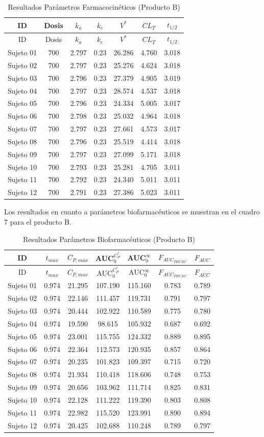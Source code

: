 \documentclass[]{article}
\begin{document}
\begin{longtable}[]{@{}ccccccc@{}}
\caption{Resultados Parámetros Farmacocinéticos (Producto
B)}\tabularnewline
\toprule
ID & Dosis & \(k_{a}\) & \(k_{e}\) & \(V^{*}\) & \(CL_{T}\) &
\(t_{1/2}\)\tabularnewline
\midrule
\endfirsthead
\toprule
ID & Dosis & \(k_{a}\) & \(k_{e}\) & \(V^{*}\) & \(CL_{T}\) &
\(t_{1/2}\)\tabularnewline
\midrule
\endhead
Sujeto 01 & 700 & 2.797 & 0.23 & 26.286 & 4.760 & 3.018\tabularnewline
Sujeto 02 & 700 & 2.797 & 0.23 & 25.276 & 4.624 & 3.018\tabularnewline
Sujeto 03 & 700 & 2.796 & 0.23 & 27.379 & 4.905 & 3.019\tabularnewline
Sujeto 04 & 700 & 2.797 & 0.23 & 28.574 & 4.537 & 3.018\tabularnewline
Sujeto 05 & 700 & 2.796 & 0.23 & 24.334 & 5.005 & 3.017\tabularnewline
Sujeto 06 & 700 & 2.798 & 0.23 & 25.032 & 4.964 & 3.018\tabularnewline
Sujeto 07 & 700 & 2.797 & 0.23 & 27.661 & 4.573 & 3.017\tabularnewline
Sujeto 08 & 700 & 2.796 & 0.23 & 25.519 & 4.414 & 3.018\tabularnewline
Sujeto 09 & 700 & 2.797 & 0.23 & 27.099 & 5.171 & 3.018\tabularnewline
Sujeto 10 & 700 & 2.793 & 0.23 & 25.281 & 4.705 & 3.011\tabularnewline
Sujeto 11 & 700 & 2.792 & 0.23 & 24.340 & 5.011 & 3.011\tabularnewline
Sujeto 12 & 700 & 2.791 & 0.23 & 27.386 & 5.023 & 3.011\tabularnewline
\bottomrule
\end{longtable}

Los resultados en cuanto a parámetros biofarmacéuticos se muestran en el
cuadro 7 para el producto B.

\begin{longtable}[]{@{}ccccccc@{}}
\caption{Resultados Parámetros Biofarmacéuticos (Producto
B)}\tabularnewline
\toprule
ID & \(t_{max}\) & \(C_{P,max}\) & AUC\(_{0}^{C_{P}^{*}}\) &
AUC\(_{0}^{\infty}\) & \(F_{AUC_{TRUNC}}\) & \(F_{AUC}\)\tabularnewline
\midrule
\endfirsthead
\toprule
ID & \(t_{max}\) & \(C_{P,max}\) & AUC\(_{0}^{C_{P}^{*}}\) &
AUC\(_{0}^{\infty}\) & \(F_{AUC_{TRUNC}}\) & \(F_{AUC}\)\tabularnewline
\midrule
\endhead
Sujeto 01 & 0.974 & 21.295 & 107.190 & 115.160 & 0.783 &
0.789\tabularnewline
Sujeto 02 & 0.974 & 22.146 & 111.457 & 119.731 & 0.791 &
0.797\tabularnewline
Sujeto 03 & 0.974 & 20.444 & 102.922 & 110.589 & 0.775 &
0.780\tabularnewline
Sujeto 04 & 0.974 & 19.590 & 98.615 & 105.932 & 0.687 &
0.692\tabularnewline
Sujeto 05 & 0.974 & 23.001 & 115.755 & 124.332 & 0.889 &
0.895\tabularnewline
Sujeto 06 & 0.974 & 22.364 & 112.573 & 120.935 & 0.857 &
0.864\tabularnewline
Sujeto 07 & 0.974 & 20.235 & 101.823 & 109.397 & 0.715 &
0.720\tabularnewline
Sujeto 08 & 0.974 & 21.934 & 110.418 & 118.606 & 0.748 &
0.753\tabularnewline
Sujeto 09 & 0.974 & 20.656 & 103.962 & 111.714 & 0.825 &
0.831\tabularnewline
Sujeto 10 & 0.974 & 22.128 & 111.222 & 119.390 & 0.803 &
0.808\tabularnewline
Sujeto 11 & 0.974 & 22.982 & 115.520 & 123.991 & 0.890 &
0.894\tabularnewline
Sujeto 12 & 0.974 & 20.425 & 102.688 & 110.248 & 0.789 &
0.797\tabularnewline
\bottomrule
\end{longtable}
\end{document}

